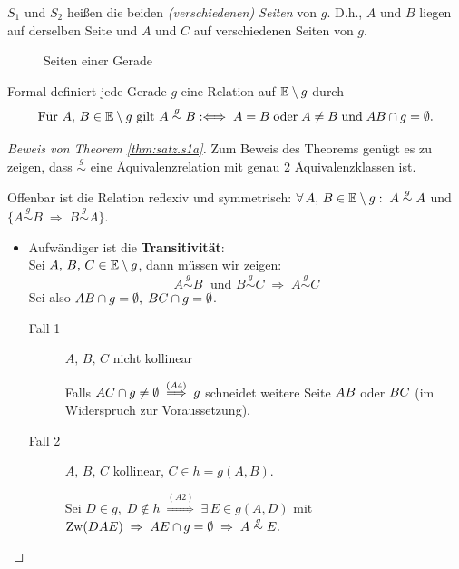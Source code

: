 $S_1$ und $S_2$ heißen die beiden \emph{(verschiedenen) Seiten} von $g$. D.h., $A$ und $B$
liegen auf derselben Seite und $A$ und $C$ auf verschiedenen Seiten von $g$.

\begin{figure}[h]
    
    \caption{Seiten einer Gerade}
\end{figure}

Formal definiert jede Gerade $g$ eine Relation auf $\mathbb E\setminus g$ durch
$$
    \mbox{Für } A,\, B \in \mathbb E \setminus g \mbox{ gilt } A \stackrel{g}{\sim} B :
    \Longleftrightarrow\; A=B\; \mbox{oder}\; A \neq B\; \mbox{und}\; {AB} \cap g = \emptyset.
$$
\begin{proof}[Beweis von Theorem \ref{thm:satz.s1a}]
    Zum Beweis des Theorems genügt es zu zeigen, dass $\stackrel{g}{\sim}$ eine Äquivalenzrelation
    mit genau 2 Äquivalenzklassen ist.

    Offenbar ist die Relation reflexiv und symmetrisch: $\forall\, A,\, B \in \mathbb E \setminus g : \; A
    \stackrel{g}{\sim} A$ und $\{A \stackrel{g}{\sim} B\; \Rightarrow\; B \stackrel{g}{\sim} A\}$.

    \begin{itemize}
        \item Aufwändiger ist die {\bf Transitivität}:\\
        Sei $A,\, B,\, C \in \mathbb E \setminus g$, dann müssen wir zeigen:
        $$
            A \stackrel{g}{\sim} B\; \mbox{ und } B \stackrel{g}{\sim} C\; \Rightarrow\; A
            \stackrel{g}{\sim} C
        $$
        Sei also ${AB} \cap g = \emptyset,\; {BC} \cap g = \emptyset$.

        \begin{description}
            \item[Fall 1] $A,\, B,\, C$ nicht kollinear

                Falls ${AC} \cap g \neq \emptyset\; \stackrel{(A4)}{\Longrightarrow}\; g$
                schneidet weitere Seite ${AB}$ oder ${BC}$ (im Widerspruch zur
                Voraussetzung).

            \item[Fall 2] $A,\, B,\, C$ kollinear, $C \in h = g(A,B)$.

                Sei $D \in g,\; D \notin h\; \stackrel{(A2)}{\Longrightarrow}\; \exists\, E \in
                g(A,D)$ mit $\operatorname{Zw}(DAE)\; \Rightarrow\; {AE} \cap g = \emptyset\; \Rightarrow\; A
                \stackrel{g}{\sim} E.$


\end{description}
\end{itemize}
\end{proof}
